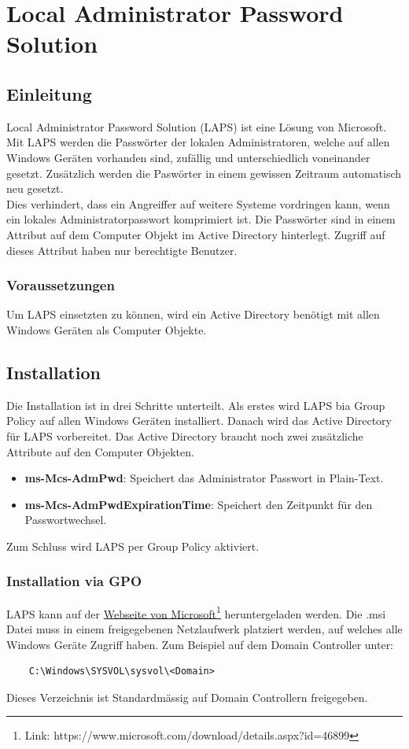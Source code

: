 \chapter{Local Administrator Password Solution}
\section{Einleitung}
Local Administrator Password Solution (LAPS) ist eine Lösung von Microsoft.
Mit LAPS werden die Passwörter der lokalen Administratoren, welche auf allen Windows Geräten vorhanden sind, zufällig und unterschiedlich voneinander gesetzt.
Zusätzlich werden die Paswörter in einem gewissen Zeitraum automatisch neu gesetzt.\\

Dies verhindert, dass ein Angreiffer auf weitere Systeme vordringen kann, wenn ein lokales Administratorpasswort komprimiert ist.
Die Passwörter sind in einem Attribut auf dem Computer Objekt im Active Directory hinterlegt.
Zugriff auf dieses Attribut haben nur berechtigte Benutzer.

\subsection{Voraussetzungen}
Um LAPS einsetzten zu können, wird ein Active Directory benötigt mit allen Windows Geräten als Computer Objekte.

\section{Installation}
Die Installation ist in drei Schritte unterteilt.
Als erstes wird LAPS bia Group Policy auf allen Windows Geräten installiert.
Danach wird das Active Directory für LAPS vorbereitet.
Das Active Directory braucht noch zwei zusätzliche Attribute auf den Computer Objekten.
\begin{itemize}
    \item \textbf{ms-Mcs-AdmPwd}: Speichert das Administrator Passwort in Plain-Text.
    \item \textbf{ms-Mcs-AdmPwdExpirationTime}: Speichert den Zeitpunkt für den Passwortwechsel.
\end{itemize}

Zum Schluss wird LAPS per Group Policy aktiviert.


\subsection{Installation via GPO}
LAPS kann auf der \href{https://www.microsoft.com/download/details.aspx?id=46899}{Webseite von Microsoft}\footnote{Link: https://www.microsoft.com/download/details.aspx?id=46899} heruntergeladen werden.
Die .msi Datei muss in einem freigegebenen Netzlaufwerk platziert werden, auf welches alle Windows Geräte Zugriff haben.
Zum Beispiel auf dem Domain Controller unter:
\begin{lstlisting}
    C:\Windows\SYSVOL\sysvol\<Domain>
\end{lstlisting}
Dieses Verzeichnis ist Standardmässig auf Domain Controllern freigegeben.\\

